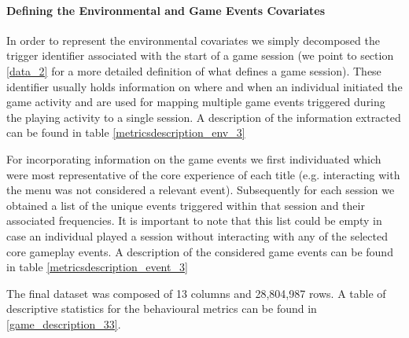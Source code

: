 \paragraph*{Defining the Environmental and Game Events Covariates}
In order to represent the environmental covariates we simply decomposed the trigger identifier associated with the start of a game session (we point to section \ref{data_2} for a more detailed definition of what defines a game session). These identifier usually holds information on where and when an individual initiated the game activity and are used for mapping multiple game events triggered during the playing activity to a single session. A description of the information extracted can be found in table \ref{metricsdescription_env_3}

For incorporating information on the game events we first individuated which were most representative of the core experience of each title (e.g. interacting with the menu was not considered a relevant event). Subsequently for each session we obtained a list of the unique events triggered within that session and their associated frequencies. It is important to note that this list could be empty in case an individual played a session without interacting with any of the selected core gameplay events. A description of the considered game events can be found in table \ref{metricsdescription_event_3}

The final dataset was composed of 13 columns and 28,804,987 rows. A table of descriptive statistics for the behavioural metrics can be found in \ref{game_description_33}.

